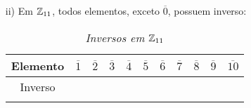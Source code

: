 \documentclass{beamer}
\begin{document}
    \begin{frame}
        \begin{exemplos}
            \begin{enumerate}
                \item[ii)] Em $\mathbb{Z}_{11}$, \pause todos elementos, exceto $\overline{0}$, \pause possuem inverso:
                \begin{table}[h]
                    \caption{\it Inversos em $\mathbb{Z}_{11}$}
                   \begin{tabular}{|c|c|c|c|c|c|c|c|c|c|c|} 
                        \hline
                        Elemento & $\overline{1}$ & $\overline{2}$ & $\overline{3}$ & $\overline{4}$ & $\overline{5}$ & $\overline{6}$ & $\overline{7}$ & $\overline{8}$ & $\overline{9}$ & $\overline{10}$\T \\
                        \hline
                        Inverso & \phantom{ab} & \phantom{ab} & \phantom{ab} & \phantom{ab} & \phantom{ab} & \phantom{ab} & \phantom{ab} & \phantom{ab} & \phantom{ab} & \phantom{ab} \T\\
                        & & & & & & & & & & \\
                        \hline
                   \end{tabular}
                \end{table}
            \end{enumerate}
            \vspace{4.5cm}
        \end{exemplos}
    \end{frame}
\end{document}
